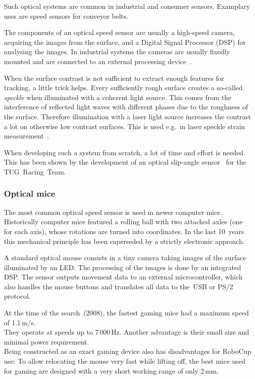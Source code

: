 \documentclass[12pt,a4paper]{article}
\begin{document}
Such optical systems are common in industrial and consumer sensors.
Examplary uses are speed sensors for conveyor belts.

The components of an optical speed sensor are usually a high-speed camera, acquiring the images from the surface, and a Digital Signal Processor (DSP) for analysing the images.
In industrial systems the cameras are usually fixedly mounted and are connected to an external processing device~\cite{opt_vel}.

When the surface contrast is not sufficient to extract enough features for tracking, a little trick helps.
Every sufficiently rough surface creates a so-called \emph{speckle} when illuminated with a coherent light source.
This comes from the interference of reflected light waves with different phases due to the roughness of the surface.
Therefore illumination with a laser light source increases the contrast a lot on otherwise low contrast surfaces.
This is used e.g.\ in laser speckle strain measurement~\cite{strain}.

When developing such a system from scratch, a lot of time and effort is needed.
This has been shown by the development of an optical slip-angle sensor~\cite{Hrach2006} for the TUG~Racing~Team.

\subsubsection{Optical mice}

The most common optical speed sensor is used in newer computer mice.
Historically computer mice featured a rolling ball with two attached axles (one for each axis), whose rotations are turned into coordinates.
In the last 10~years this mechanical principle has been superseded by a strictly electronic approach.

A standard optical mouse consists in a tiny camera taking images of the surface illuminated by an LED.
The processing of the images is done by an integrated DSP.
The sensor outputs movement data to an external microcontroller, which also handles the mouse buttons and translates all data to the~USB or PS/2 protocol.

At the time of the search~(2008), the fastest gaming mice had a maximum speed of 1.1\,m/s.\\
They operate at speeds up to 7\,000\,Hz.
Another advantage is their small size and minimal power requirement.\\
Being constructed as an exact gaming device also has disadvantages for RoboCup use:
To allow relocating the mouse very fast while lifting off, the best mice used for gaming are designed with a very short working range of only 2\,mm.
\end{document}
